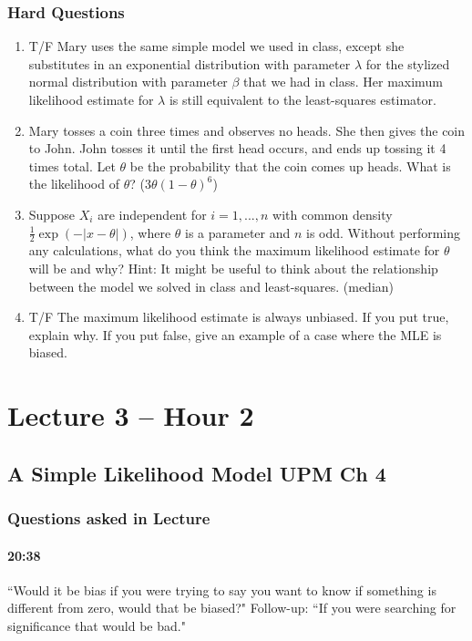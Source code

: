 \documentclass[11pt]{article}
\begin{document}
\subsubsection{Hard Questions}
\begin{enumerate}
\item T/F Mary uses the same simple model we used in class, except she substitutes in an exponential distribution with parameter $\lambda$ for the stylized normal distribution with parameter $\beta$ that we had in class.  Her maximum likelihood estimate for $\lambda$ is still equivalent to the least-squares estimator. 
\item Mary tosses a coin three times and observes no heads.  She then gives the coin to John.  John tosses it until the first head occurs, and ends up tossing it 4 times total.  Let $\theta$ be the probability that the coin comes up heads.  What is the likelihood of $\theta$? ($3\theta(1-\theta)^6$) 
\item Suppose $X_i$ are independent for $i=1,...,n$ with common density $\frac{1}{2}\exp{(-|x-\theta|)}$, where $\theta$ is a parameter and $n$ is odd.   Without performing any calculations, what do you think the maximum likelihood estimate for $\theta$ will be and why? Hint:  It might be useful to think about the relationship between the model we solved in class and least-squares. (median) 
\item T/F The maximum likelihood estimate is always unbiased.  If you put true, explain why. If you put false, give an example of a case where the MLE is biased.  
\end{enumerate}


\section{Lecture 3 -- Hour 2}
\subsection{A Simple Likelihood Model UPM Ch 4}
\subsubsection{Questions asked in Lecture}
\paragraph{20:38}  ``Would it be bias if you were trying to say you want to know if something is different from zero, would that be biased?" Follow-up:  ``If you were searching for significance that would be bad."
\end{document}
